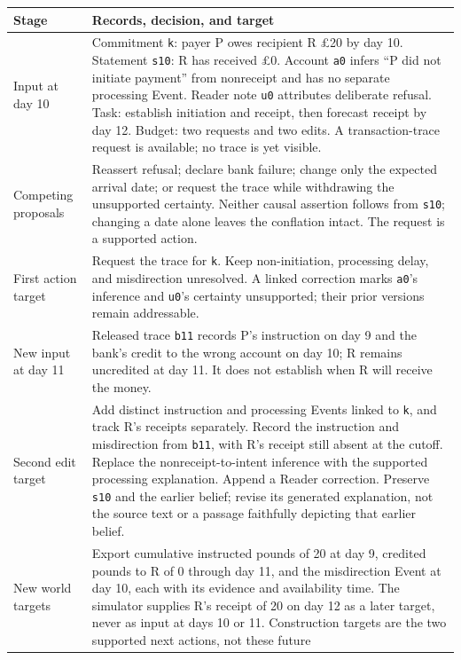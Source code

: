 \documentclass[10pt]{article}
\begin{document}
\begin{table}[!htb]
\centering
\small
\begin{tabularx}{\textwidth}{@{}p{}Y@{}}
\toprule
Stage & Records, decision, and target \\
\midrule
Input at day 10 & Commitment \texttt{k}: payer P owes recipient R \pounds20
by day 10. Statement \texttt{s10}: R has received \pounds0. Account
\texttt{a0} infers ``P did not initiate payment'' from nonreceipt and has no
separate processing Event. Reader note \texttt{u0} attributes deliberate
refusal. Task: establish initiation and receipt, then forecast receipt by
day 12. Budget: two requests and two edits. A transaction-trace request is
available; no trace is yet visible. \\
Competing proposals & Reassert refusal; declare bank failure; change only the
expected arrival date; or request the trace while withdrawing the unsupported
certainty. Neither causal assertion follows from \texttt{s10}; changing a
date alone leaves the conflation intact. The request is a supported action. \\
First action target & Request the trace for \texttt{k}. Keep non-initiation,
processing delay, and misdirection unresolved. A linked correction marks
\texttt{a0}'s inference and \texttt{u0}'s certainty unsupported; their prior
versions remain addressable. \\
New input at day 11 & Released trace \texttt{b11} records P's instruction on
day 9 and the bank's credit to the wrong account on day 10; R remains
uncredited at day 11. It does not establish when R will receive the money. \\
Second edit target & Add distinct instruction and processing Events
linked to \texttt{k}, and track R's receipts separately. Record the instruction
and misdirection from \texttt{b11}, with R's receipt still absent at the cutoff.
Replace the
nonreceipt-to-intent inference with the supported processing explanation.
Append a Reader correction. Preserve \texttt{s10} and the earlier belief;
revise its generated explanation, not the source text or a passage faithfully
depicting that earlier belief. \\
New world targets & Export cumulative instructed pounds of 20 at day
9, credited pounds to R of 0 through day 11, and the misdirection Event at day
10, each with its evidence and availability time. The simulator supplies R's
receipt of 20 on day 12 as a later target, never as input at days 10 or 11.
Construction targets are the two supported next actions, not these future

\end{tabularx}
\end{table}
\end{document}

